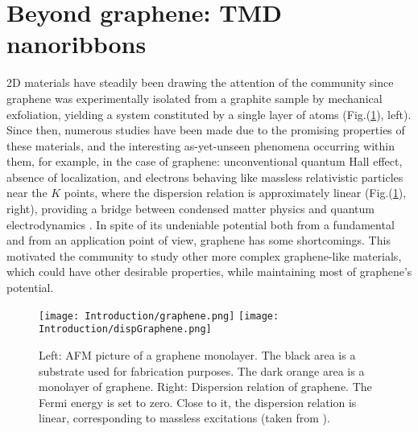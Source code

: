 \section{Beyond graphene: TMD nanoribbons}
\label{sec:state}

\ac{2D} materials have steadily been drawing the attention of the community since graphene was experimentally isolated from a graphite sample by mechanical exfoliation, yielding a system constituted by a single layer of atoms (Fig.(\ref{fig:graphene}), left).
Since then, numerous studies have been made due to the promising properties of these materials, and the interesting as-yet-unseen phenomena occurring within them, for example, in the case of graphene: unconventional quantum Hall effect, absence of localization, and electrons behaving like massless relativistic particles near the $K$ points, where the dispersion relation is approximately linear (Fig.(\ref{fig:graphene}), right), providing a bridge between condensed matter physics and quantum electrodynamics \cite{katsnelson_graphene:_2007}.
In spite of its undeniable potential both from a fundamental and from an application point of view, graphene has some shortcomings.
This motivated the community to study other more complex graphene-like materials, which could have other desirable properties, while maintaining most of graphene's potential.

\begin{figure}[H]
\hspace{1.5cm}
\texttt{[image: Introduction/graphene.png]}
\hspace{2.5cm}
\texttt{[image: Introduction/dispGraphene.png]}
\caption[Graphene monolayer; graphene's dispersion relation.]{Left: \acf{AFM} picture of a graphene monolayer. The black area is a substrate used for fabrication purposes. The dark orange area is a monolayer of graphene. Right: Dispersion relation of graphene. The Fermi energy is set to zero. Close to it, the dispersion relation is linear, corresponding to massless excitations (taken from \cite{castro_neto_electronic_2009}). }
\label{fig:graphene}
\end{figure}	

